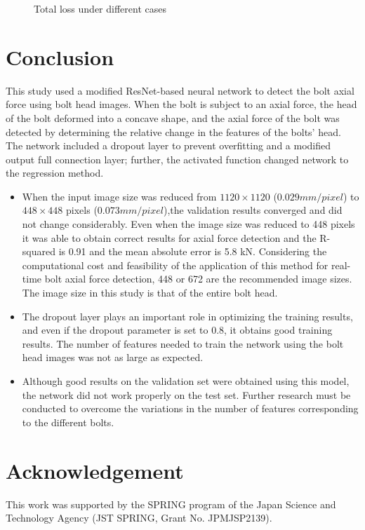 \documentclass{proc-a4}
\begin{document}
\begin{figure*}
    \centering
{}
    \caption{Total loss under different cases}
    \label{fig-trainloss}
\end{figure*}

\section{Conclusion}

This study used a modified ResNet-based neural network to detect the bolt axial force using bolt head images. When the bolt is subject to an axial force, the head of the bolt deformed into a concave shape, and the axial force of the bolt was detected by determining the relative change in the features of the bolts' head. The network included a dropout layer to prevent overfitting and a modified output full connection layer; further, the activated function changed network to the regression method. 
\begin{itemize}
\item When the input image size was reduced from $1120\times 1120$ ($0.029 mm/pixel$) to $448 \times 448$ pixels ($0.073 mm/pixel$),the validation results converged and did not change considerably. Even when the image size was reduced to 448 pixels it was able to obtain correct results for axial force detection and the R-squared is 0.91 and the mean absolute error is 5.8 kN. Considering the computational cost and feasibility of the application of this method for real-time bolt axial force detection, 448 or 672 are the recommended image sizes. The image size in this study is that of the entire bolt head.
\item The dropout layer plays an important role in optimizing the training results, and even if the dropout parameter is set to 0.8, it obtains good training results. The number of features needed to train the network using the bolt head images was not as large as expected.
\item Although good results on the validation set were obtained using this model, the network did not work properly on the test set. Further research must be conducted to overcome the variations in the number of features corresponding to the different bolts.
\end{itemize}


\section*{Acknowledgement}
This work was supported by the SPRING program of the Japan Science and Technology Agency (JST SPRING, Grant No. JPMJSP2139).

\normalsize{

}
\end{document}
